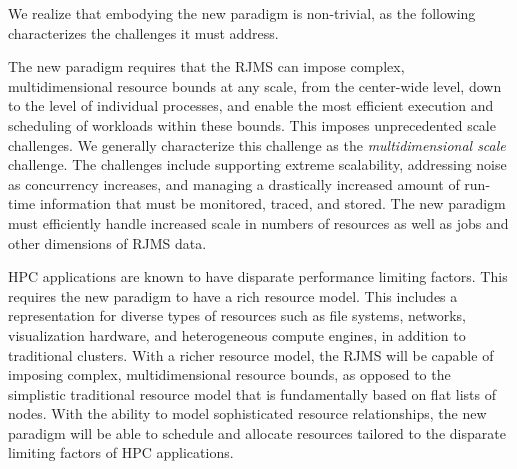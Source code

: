 
We realize that embodying the new paradigm is non-trivial, as
the following characterizes the challenges it must address.

The new paradigm requires that the RJMS can impose
complex, multidimensional resource bounds at any scale, 
from the center-wide level, down to the level of individual processes,
and enable the most efficient execution and
scheduling of workloads within these bounds.
This imposes unprecedented scale challenges. 
We generally characterize this challenge 
as the {\em multidimensional scale} challenge. The challenges include
supporting extreme scalability, addressing noise as concurrency
increases, and managing a drastically increased amount of
run-time information that must be monitored, traced, and stored.
The new paradigm must efficiently handle increased scale in
numbers of resources as well as jobs and other dimensions 
of RJMS data.

HPC applications are known to have disparate performance 
limiting factors. This requires
the new paradigm to have a rich resource model.
This includes a representation for diverse
types of resources such as file systems, networks, visualization
hardware, and heterogeneous compute engines, in addition to
traditional clusters.
With a richer resource model, the RJMS will be capable of imposing
complex, multidimensional resource bounds, as opposed to the
simplistic traditional resource model that is fundamentally based on
flat lists of nodes.
With the ability to model sophisticated resource relationships,
the new paradigm will be able to schedule and
allocate resources tailored to the disparate limiting
factors of HPC applications.  

